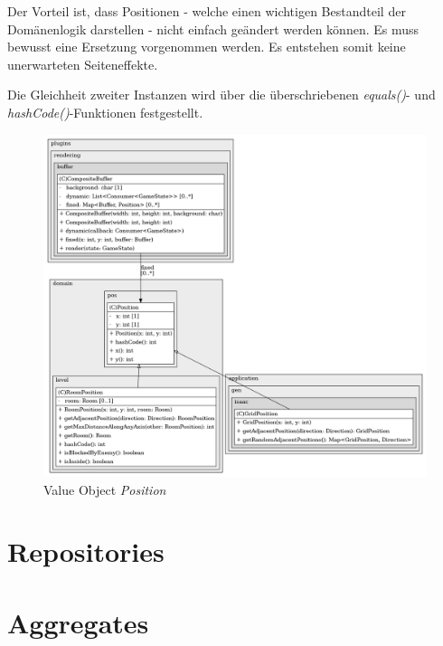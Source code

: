 Der Vorteil ist, dass Positionen - welche einen wichtigen Bestandteil
der Domänenlogik darstellen - nicht einfach geändert werden können.
Es muss bewusst eine Ersetzung vorgenommen werden. Es entstehen somit
keine unerwarteten Seiteneffekte.

Die Gleichheit zweiter Instanzen wird über die überschriebenen
\textit{equals()}- und \textit{hashCode()}-Funktionen festgestellt.

\vspace{0.5cm}
\begin{figure}[H]
    \centering
    \includegraphics[width=0.8\linewidth]{Bilder/Visualisierung/Position_structure.png}
    \caption{Value Object \textit{Position}}
\end{figure}

\section{Repositories}

\section{Aggregates}